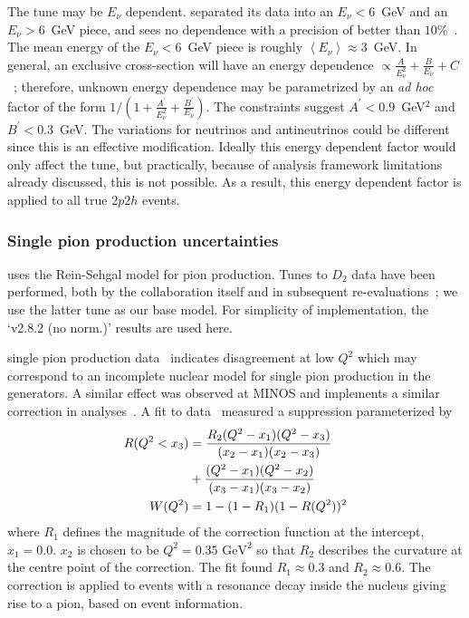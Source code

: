 The \minerva tune may be $E_\nu$ dependent. \minerva separated its data into an $E_\nu<6$~GeV and an $E_\nu>$6~GeV piece, and sees no dependence with a precision of better than $10\%$~\cite{Rodrigues:2015hik}.  The mean energy of the $E_\nu<6$~GeV piece is roughly $\left< E_\nu\right>\approx 3$~GeV.  In general, an exclusive cross-section will have an energy dependence $\propto \frac{A}{E_\nu^2}+\frac{B}{E_\nu}+C$~\cite{llewelyn-smith}; therefore, unknown energy dependence may be parametrized by an {\em ad hoc} factor of the form $1/\left(1+ \frac{A^{'}}{E_\nu^2 }+\frac{B^{'}}{E_\nu}\right)$.  The \minerva constraints suggest $A^{'}<0.9$~GeV$^2$ and $B^{'}<0.3$~GeV.  The variations for neutrinos and antineutrinos could be different since this is an effective modification. Ideally this energy dependent factor would only affect the \minerva tune, but practically, because of analysis framework limitations already discussed, this is not possible. As a result, this energy dependent factor is applied to all true $2p2h$ events.

\subsubsection{Single pion production uncertainties}
 uses the Rein-Sehgal model for pion production. Tunes to $D_2$ data have been performed, both by the  collaboration itself and in subsequent re-evaluations~\cite{Rodrigues:2016xjj}; we use the latter tune as our base model. For simplicity of implementation, the `v2.8.2 (no norm.)' results are used here. %

\minerva single pion production data~\cite{Altinok:2017xua,McGivern:2016bwh,Eberly:2014mra} indicates disagreement at low $Q^2$ which may correspond to an incomplete nuclear model for single pion production in the generators. A similar effect was observed at MINOS\cite{minos_pi_q2} and \nova implements a similar correction in analyses~\cite{nova_2018}.
A fit to \minerva data~\cite{StowellThesis} measured a suppression parameterized by
\begin{align}
R(Q^2<x_3) & = \frac{R_{2} (Q^2-x_1)(Q^2-x_3)}{(x_2-x_1)(x_2-x_3)} \notag\\
             & + \frac{(Q^2-x_1)(Q^2-x_2)}{(x_3-x_1)(x_3-x_2)}  \\
W(Q^{2}) &= 1-(1-R_{1})(1-R(Q^{2}))^{2}
\end{align}
where $R_{1}$ defines the magnitude of the correction function at the intercept, $x_{1}=0.0$. $x_{2}$ is chosen to be $Q^2=0.35\text{ GeV}^2$ so that $R_{2}$ describes the curvature at the centre point of the correction. The fit found $R_1\approx0.3$ and $R_2\approx0.6$. The correction is applied to events with a resonance decay inside the nucleus giving rise to a pion, based on  event information.


